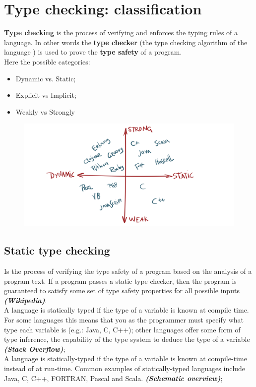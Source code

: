 \documentclass[12pt]{article}
\begin{document}
\section{Type checking: classification}
	\textbf{Type checking} is the process of verifying and enforces the typing rules of a language. In other words the \textbf{type checker} (the type checking algorithm of the language ) is used to prove the \textbf{type safety} of a program.\\
	Here the possible categories:
	\begin{itemize}
		\item Dynamic vs. Static;
		\item Explicit vs Implicit;
		\item Weakly vs Strongly
	\end{itemize}

	\begin{figure}[h!]
		\centering
		\includegraphics[scale=0.20]{img/classification.png}
	\end{figure}

	\subsection{Static type checking}
		Is the process of verifying the type safety of a program based on the analysis of a program text.  If a program passes a static type checker, then the program is guaranteed to satisfy some set of type safety properties for all possible inputs \textit{\textbf{(Wikipedia)}}.\\
		A language is statically typed if the type of a variable is known at compile time. For some languages this means that you as the programmer must specify what type each variable is (e.g.: Java, C, C++); other languages offer some form of type inference, the capability of the type system to deduce the type of a variable \textit{\textbf{(Stack Overflow)}};\\
		A language is statically-typed if the type of a variable is known at compile-time instead of at run-time. Common examples of statically-typed languages include Java, C, C++, FORTRAN, Pascal and Scala. \textbf{\textit{(Schematic overview)}};\\
		
\end{document}
